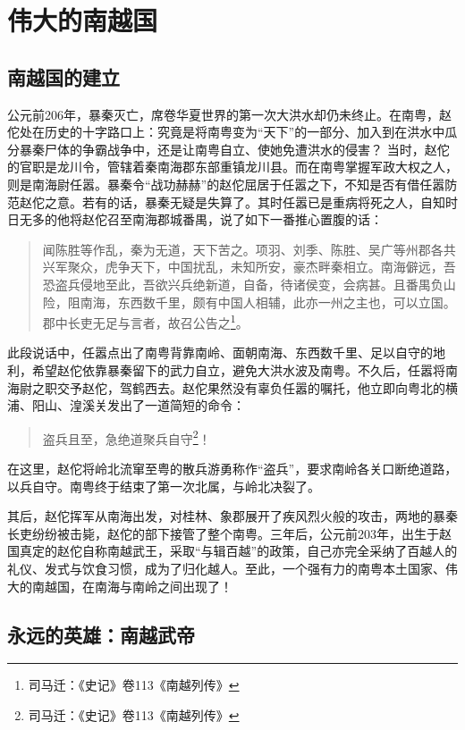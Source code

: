 \chapter{伟大的南越国}

\section{南越国的建立}

\indent 公元前206年，暴秦灭亡，席卷华夏世界的第一次大洪水却仍未终止。在南粤，赵佗处在历史的十字路口上：究竟是将南粤变为“天下”的一部分、加入到在洪水中瓜分暴秦尸体的争霸战争中，还是让南粤自立、使她免遭洪水的侵害？
当时，赵佗的官职是龙川令，管辖着秦南海郡东部重镇龙川县。而在南粤掌握军政大权之人，则是南海尉任嚣。暴秦令“战功赫赫”的赵佗屈居于任嚣之下，不知是否有借任嚣防范赵佗之意。若有的话，暴秦无疑是失算了。其时任嚣已是重病将死之人，自知时日无多的他将赵佗召至南海郡城番禺，说了如下一番推心置腹的话：

\begin{quote}
	闻陈胜等作乱，秦为无道，天下苦之。项羽、刘季、陈胜、吴广等州郡各共兴军聚众，虎争天下，中国扰乱，未知所安，豪杰畔秦相立。南海僻远，吾恐盗兵侵地至此，吾欲兴兵绝新道，自备，待诸侯变，会病甚。且番禺负山险，阻南海，东西数千里，颇有中国人相辅，此亦一州之主也，可以立国。郡中长吏无足与言者，故召公告之\footnote{ 司马迁：《史记》卷113《南越列传》}。
\end{quote}

此段说话中，任嚣点出了南粤背靠南岭、面朝南海、东西数千里、足以自守的地利，希望赵佗依靠暴秦留下的武力自立，避免大洪水波及南粤。不久后，任嚣将南海尉之职交予赵佗，驾鹤西去。赵佗果然没有辜负任嚣的嘱托，他立即向粤北的横浦、阳山、湟溪关发出了一道简短的命令：

\begin{quote}
	盗兵且至，急绝道聚兵自守\footnote{司马迁：《史记》卷113《南越列传》}！
\end{quote}

在这里，赵佗将岭北流窜至粤的散兵游勇称作“盗兵”，要求南岭各关口断绝道路，以兵自守。南粤终于结束了第一次北属，与岭北决裂了。

其后，赵佗挥军从南海出发，对桂林、象郡展开了疾风烈火般的攻击，两地的暴秦长吏纷纷被击毙，赵佗的部下接管了整个南粤。三年后，公元前203年，出生于赵国真定的赵佗自称南越武王，采取“与辑百越”的政策，自己亦完全采纳了百越人的礼仪、发式与饮食习惯，成为了归化越人。至此，一个强有力的南粤本土国家、伟大的南越国，在南海与南岭之间出现了！

\section{永远的英雄：南越武帝}

